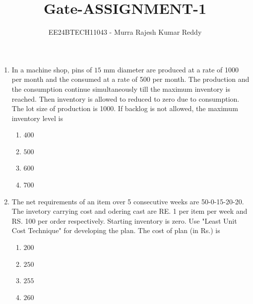 \documentclass[journal,12pt,onecolumn,article]{IEEEtran}
\theoremstyle{remark}
\begin{document}

\vspace{3cm}
\title{Gate-ASSIGNMENT-1}
\author{EE24BTECH11043 - Murra Rajesh Kumar Reddy}
\maketitle
\bigskip
\begin{enumerate}
	\item In a machine shop, pins of $15$ mm diameter are produced at a rate of 1000 per month and the consumed at a rate of 500 per month. The production and the consumption continue simultaneously till the maximum inventory is reached. Then inventory is allowed to reduced to zero due to consumption. The lot size of production is 1000. If backlog is not allowed, the maximum inventory level is 
	\begin{enumerate}
		\item $400$
		\item $500$
		\item $600$
		\item $700$
	\end{enumerate}
\item The net requirements of an item over 5 consecutive weeks are 50-0-15-20-20. The invetory carrying cost and odering cast are RE. 1 per item per week and RS. 100 per order respectively. Starting inventory is zero. Use "Least Unit Cost Technique" for developing the plan. The cost of plan (in Rs.) is 
	\begin{enumerate}
		\item $200$
		\item $250$
		\item $255$
		\item $260$
	\end{enumerate}

\end{enumerate}
\end{document}
